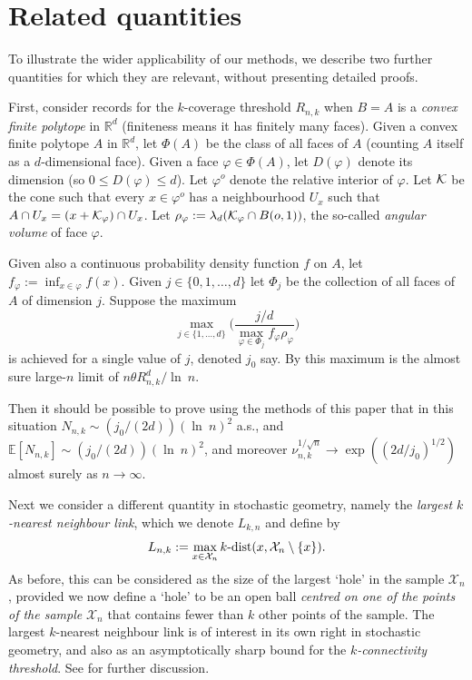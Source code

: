 \documentclass[12pt]{article}
\newcommand{\X}{\mathcal{X}}
\newcommand{\R}{\mathbb{R}}
\newcommand{\dist}{{\rm dist}}
\renewcommand{\log}{{\ln \:}}
\newcommand{\eqco}{\setcounter{equation}{0}}
\newcommand{\thco}{\setcounter{theo}{0}}
\newcommand{\prco}{\setcounter{prop}{0}}
\newcommand{\laco}{\setcounter{lemm}{0}}
\newcommand{\coco}{\setcounter{coro}{0}}
\newcommand{\cjco}{\setcounter{conj}{0}}
\newcommand{\deco}{\setcounter{defn}{0}}
\newcommand{\allco}{\eqco  \thco \prco \laco \coco \cjco \deco}
\begin{document}
\section{Related quantities}
\label{s:related}
\allco

To illustrate the wider applicability of our methods, we describe
two further quantities for which they are relevant, without
presenting detailed proofs.

First, consider records for the $k$-coverage threshold $R_{n,k}$
when $B=A$ is a {\em convex  finite polytope} in $\R^d$ (finiteness
means it has finitely many faces). 
Given a convex finite
polytope $A$ in $\R^d$, let $\Phi(A)$ be the class of all faces
of $A$ (counting $A$ itself as a $d$-dimensional face).
Given a face $\varphi \in \Phi(A)$, let 
$D(\varphi)$ denote its dimension (so $0 \leq D(\varphi) \leq d$).
Let $\varphi^o$ denote the relative interior of $\varphi$.
Let ${\cal K} $ be the cone such that every $x \in \varphi^o$
has a neighbourhood $U_x$ such that $A \cap U_x =
(x + {\cal K}_\varphi) \cap U_x$.
Let $\rho_\varphi := \lambda_d({\cal K}_\varphi \cap B(o,1))$,
the so-called {\em angular volume} of face $\varphi$.




Given also a continuous probability density function
$f$ on $A$, let
$f_\varphi := \inf_{x \in \varphi} f(x)$.
Given $j \in \{0,1,\ldots,d\}$ let $\Phi_j$ be the collection
of all faces of $A$ of dimension $j$.
Suppose the maximum
$$
\max_{j \in \{1,\ldots,d\}} \Big( \frac{ j/d}{\max_{\varphi \in \Phi_j}
f_\varphi \rho_\varphi} \Big)
$$
is achieved for a single value of $j$, denoted $j_0$ say. 
By \cite[Theorem 4.2]{MPCov} this maximum is the almost sure
large-$n$ limit
of $n \theta R_{n,k}^d/\log n$. 

Then it
should be possible to prove using the methods of this paper that
in this situation
$N_{n,k} \sim (j_0/(2d)) (\log n)^2$ a.s., and
$\mathbb E[N_{n,k}] \sim (j_0/(2d)) (\log n)^2$, and
moreover
$\nu_{n,k}^{1/\sqrt{n}} \to \exp((2d/j_0)^{1/2})$ 
almost surely
as $n \to \infty$.

Next we consider a different quantity in stochastic geometry,
namely the {\em largest $k$-nearest neighbour link}, which we
denote $L_{k,n}$ and define by
$$
L_{n,k} := \max_{x \in \X_n} k{\mbox -}\dist(x,\X_n \setminus \{x\}).
$$
As before, 
this can be considered as the size of the largest
`hole' in the sample $\X_n$, provided we now 
define a `hole' to be an open ball {\em centred on one of the points of
the sample} $\X_n$ that contains fewer than $k$ other points
of the sample. The largest $k$-nearest neighbour link is of interest
in its own right in stochastic geometry, and also as an asymptotically
sharp bound for the {\em $k$-connectivity threshold}.
See \cite{Poly,PYconnect} for further discussion.
\end{document}
